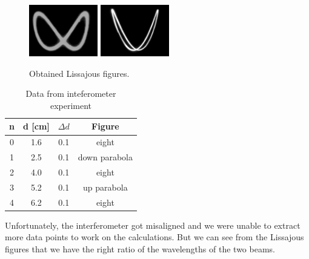 \begin{figure}[h!]
    \centering
    \includegraphics[width = 3cm]{./imagesandplots/lissjous1.jpg}
    \includegraphics[width = 3cm]{./imagesandplots/lissjous2.jpg}
    \caption{Obtained Lissajous figures.}
    \label{fig:lissjous}
\end{figure}

\begin{table}[]
    \centering
    \begin{tabular}{cccc}
        n & d [cm] & $\Delta d$ & Figure \\
        \hline
        0 & 1.6 & 0.1 & eight \\
        1 & 2.5 & 0.1 & down parabola \\
        2 & 4.0 & 0.1 & eight \\
        3 & 5.2 & 0.1 & up parabola \\
        4 & 6.2 & 0.1 & eight
    \end{tabular}
    \caption{Data from inteferometer experiment}
    \label{tab:lissajous}
\end{table}
Unfortunately, the interferometer got misaligned and we were unable to extract more data points to work on the calculations. But we can see from the Lissajous figures that we have the right ratio of the wavelengths of the two beams.